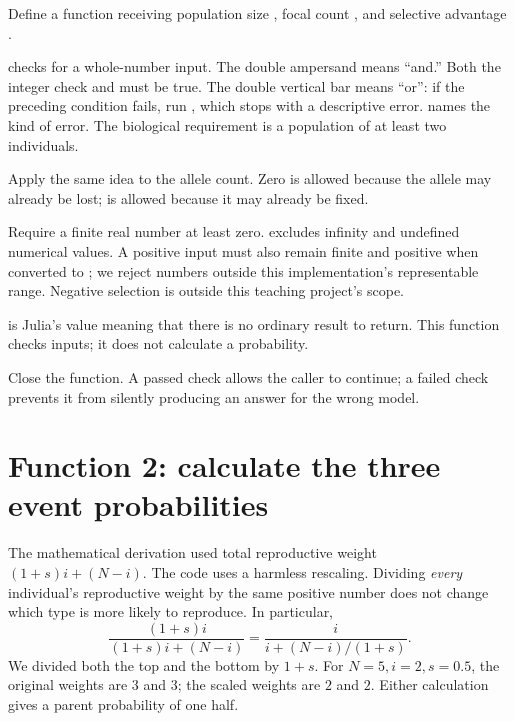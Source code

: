 \begin{description}[style=nextline]
\item[Line 11] Define a function receiving population size , focal count , and selective advantage .
\item[Line 12]  checks for a whole-number input. The double ampersand means ``and.'' Both the integer check and  must be true. The double vertical bar means ``or'': if the preceding condition fails, run , which stops with a descriptive error.  names the kind of error. The biological requirement is a population of at least two individuals.
\item[Line 13] Apply the same idea to the allele count. Zero is allowed because the allele may already be lost;  is allowed because it may already be fixed.
\item[Line 14] Require a finite real number at least zero.  excludes infinity and undefined numerical values. A positive input must also remain finite and positive when converted to ; we reject numbers outside this implementation's representable range. Negative selection is outside this teaching project's scope.
\item[Line 15]  is Julia's value meaning that there is no ordinary result to return. This function checks inputs; it does not calculate a probability.
\item[Line 16] Close the function. A passed check allows the caller to continue; a failed check prevents it from silently producing an answer for the wrong model.
\end{description}

\section{Function 2: calculate the three event probabilities}


The mathematical derivation used total reproductive weight \((1+s)i+(N-i)\). The code uses a harmless rescaling. Dividing \emph{every} individual's reproductive weight by the same positive number does not change which type is more likely to reproduce. In particular,
\[
\frac{(1+s)i}{(1+s)i+(N-i)}
=\frac{i}{i+(N-i)/(1+s)}.
\]
We divided both the top and the bottom by \(1+s\). For \(N=5,i=2,s=0.5\), the original weights are \(3\) and \(3\); the scaled weights are \(2\) and \(2\). Either calculation gives a parent probability of one half.

